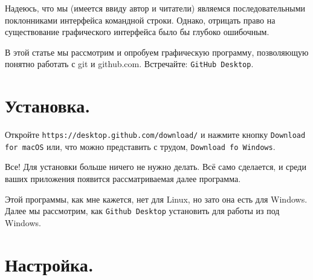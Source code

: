\documentclass[12pt,a4paper]{article}
\begin{document}
Надеюсь, что мы (имеется ввиду автор и читатели) являемся последовательными поклонниками
интерфейса командной строки. Однако, отрицать право на существование графического интерфейса было бы
глубоко ошибочным.

В этой статье мы рассмотрим и опробуем графическую программу, позволяющую понятно работать
с git и github.com. Встречайте: \texttt{GitHub Desktop}.

\section{Установка.}
Откройте \texttt{https://desktop.github.com/download/} и нажмите кнопку \texttt{Download for macOS}
 или, что можно представить с трудом, \texttt{Download fo Windows}.

Все! Для установки больше ничего не нужно делать. Всё само сделается, и среди ваших приложения
появится рассматриваемая далее программа.

Этой программы, как мне кажется, нет для Linux, но зато она есть для Windows. 
Далее мы рассмотрим, как \texttt{Github Desktop} установить для работы из под
Windows.
\section{Настройка.}
\end{document}
